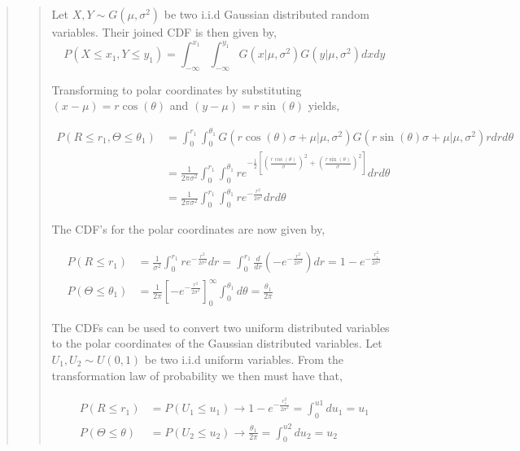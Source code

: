 \begin{quote}
\begin{quote}
Let $X, Y \sim G(\mu, \sigma ^2)$ be two i.i.d Gaussian distributed random variables. Their joined CDF is then given by, 
\begin{equation}
P(X \leq x_1, Y \leq y_1) =  \int_{-\infty}^{x_1} \int_{-\infty}^{y_1} G(x| \mu, \sigma^2) G(y| \mu, \sigma^2) dx dy
\end{equation}

Transforming to polar coordinates by substituting $ (x-\mu) = r \cos(\theta)$ and $ (y-\mu) = r\sin(\theta)$ yields,

\begin{align*}
P(R \leq r_1, \Theta \leq \theta_1) &= \int_0^{r_1} \int_{0}^{\theta_1} G(r\cos(\theta) \sigma + \mu| \mu, \sigma^2) G(r\sin(\theta) \sigma + \mu| \mu, \sigma^2) r dr d\theta \\
&= \frac{1}{2 \pi \sigma^2} \int_0^{r_1} \int_{0}^{\theta_1} re^{ -\frac{1}{2} \left[ \left( \frac{r\cos(\theta)}{\sigma} \right)^2  + \left( \frac{r\sin(\theta)}{\sigma} \right)^2 \right]}  dr d\theta \\
&=  \frac{1}{2 \pi \sigma^2} \int_0^{r_1} \int_{0}^{\theta_1} re^{ -\frac{r^2}{2 \sigma ^2} } dr d\theta
\end{align*}

The CDF's  for the polar coordinates are now given by, %

\begin{align}
P(R \leq r_1) &= \frac{1}{\sigma^2} \int_{0}^{r_1}  re^{ -\frac{r^2}{2 \sigma ^2} } dr =  \int_{0}^{r_1} \frac{d}{dr} \left( -e^{ -\frac{r^2}{2 \sigma ^2}}  \right) dr = 1 - e^{- \frac{r_1^2}{2 \sigma^2}} \\
P(\Theta \leq \theta_1) &= \frac{1}{2 \pi }  \left[ -e^{-\frac{r^2}{2 \sigma^2}} \right]^{\infty}_{0} \int_{0}^{\theta_1} d\theta = \frac{\theta_1}{2\pi}
\end{align}

The CDFs can be used to convert  two uniform distributed variables to the polar coordinates of the Gaussian distributed variables. Let $U_1, U_2 \sim U(0,1)$ be two i.i.d uniform variables. From the transformation law of probability we then must have that, %

\begin{align}
P(R \leq r_1) &= P(U_1 \leq u_1) \rightarrow  1 - e^{- \frac{r_1^2}{2\sigma^2}}  = \int_{0}^{u1} du_1 = u_1 \\
P(\Theta \leq \theta) &= P(U_2 \leq u_2) \rightarrow   \frac{\theta_1}{2\pi} = \int_{0}^{u2} du_2 = u_2 
\end{align}


\end{quote}
\end{quote}
